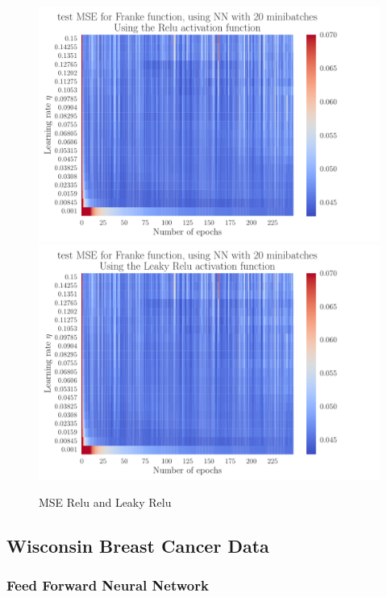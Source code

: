 \documentclass[12pt]{extarticle}
\begin{document}
\begin{figure}[h!]
	\includegraphics[width=\linewidth]{NN_Franke/NN_Franke__epochs_eta__test_MSE__relu__733938.pdf}
	\endminipage
	\includegraphics[width=\linewidth]{NN_Franke/NN_Franke__epochs_eta__test_MSE__leaky_relu__501404.pdf}
	\endminipage
	\caption{MSE Relu and Leaky Relu}
	\label{fig:NN_Franke_epochs_eta_MSE_relu_leaky}
\end{figure}


\subsection{Wisconsin Breast Cancer Data}
\subsubsection{Feed Forward Neural Network}
\clearpage
\end{document}
